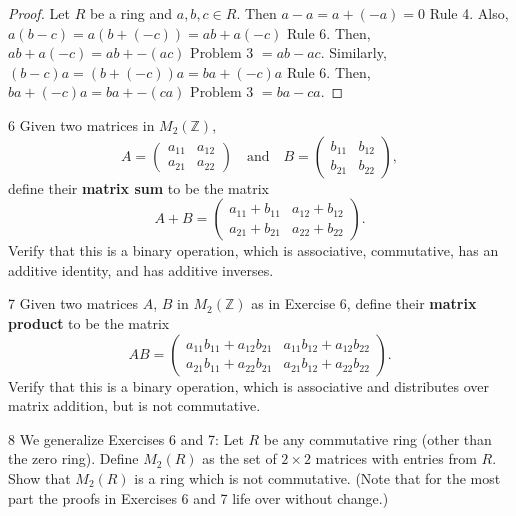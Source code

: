 \begin{proof}
    Let $R$ be a ring and $a, b, c \in R$.
    Then $a - a = a + (-a) = 0$ Rule 4.
    Also, $a(b - c) = a(b + (-c)) = ab + a(-c)$ Rule 6.
    Then, $ab + a(-c) = ab + -(ac) \text{ Problem 3 } = ab - ac$.
    Similarly, $(b - c)a = (b + (-c))a = ba + (-c)a$ Rule 6.
    Then, $ba + (-c)a = ba + -(ca) \text{ Problem 3 } = ba - ca$.
\end{proof}

\begin{problem}{6}
    Given two matrices in $M_2(\mathbb{Z})$,
    \[A = \begin{pmatrix} a_{11} & a_{12} \\ a_{21} & a_{22} \end{pmatrix}
    \quad\text{and}\quad
    B = \begin{pmatrix} b_{11} & b_{12} \\ b_{21} & b_{22} \end{pmatrix},\]
    define their \textbf{matrix sum} to be the matrix
    \[A + B = \begin{pmatrix} a_{11} + b_{11} & a_{12} + b_{12} \\ a_{21} + b_{21} & a_{22} + b_{22} \end{pmatrix}.\]
    Verify that this is a binary operation, which is associative, commutative, has an
    additive identity, and has additive inverses.
\end{problem}
\unsolved

\begin{problem}{7}
    Given two matrices $A$, $B$ in $M_2(\mathbb{Z})$ as in Exercise 6, define their
    \textbf{matrix product} to be the matrix
    \[AB = \begin{pmatrix} a_{11}b_{11} + a_{12}b_{21} & a_{11}b_{12} + a_{12}b_{22} \\
    a_{21}b_{11} + a_{22}b_{21} & a_{21}b_{12} + a_{22}b_{22} \end{pmatrix}.\]
    Verify that this is a binary operation, which is associative and distributes over
    matrix addition, but is not commutative.
\end{problem}
\unsolved

\begin{problem}{8}
    We generalize Exercises 6 and 7: Let $R$
    be any commutative ring (other than the zero ring).
    Define $M_2(R)$ as the set of $2 \times 2$
    matrices with entries from $R$. Show that $M_2(R)$
    is a ring which is not commutative. (Note that 
    for the most part the proofs in Exercises 6 and 
    7 life over without change.)
\end{problem}
\solved

